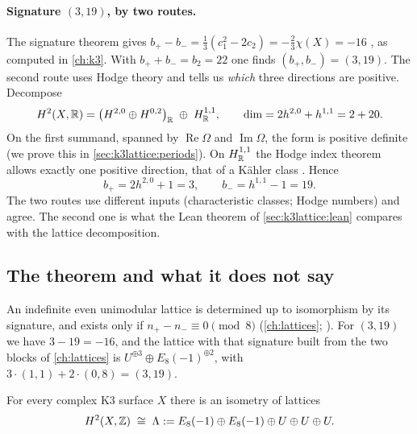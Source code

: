 \paragraph{Signature $(3,19)$, by two routes.}
The signature theorem gives $b_+-b_-=\tfrac13(c_1^2-2c_2)=-\tfrac23\chi(X)=-16$
, as computed in \cref{ch:k3}. With
$b_++b_-=b_2=22$ one finds $(b_+,b_-)=(3,19)$. The second route uses Hodge theory and tells
us \emph{which} three directions are positive. Decompose
\begin{equation}\label{eq:k3lattice:hodgesplit}
 H^2(X,\mathbb{R})=\bigl(H^{2,0}\oplus H^{0,2}\bigr)_{\mathbb{R}}\;\oplus\;H^{1,1}_{\mathbb{R}},\qquad
 \dim=2h^{2,0}+h^{1,1}=2+20 .
\end{equation}
On the first summand, spanned by $\operatorname{Re}\Omega$ and $\operatorname{Im}\Omega$, the
form is positive definite (we prove this in \cref{sec:k3lattice:periods}). On $H^{1,1}_{\mathbb{R}}$ the
Hodge index theorem allows exactly one positive direction, that of a Kähler class
. Hence
\begin{equation}\label{eq:k3lattice:bpm}
 b_+=2h^{2,0}+1=3,\qquad b_-=h^{1,1}-1=19 .
\end{equation}
The two routes use different inputs (characteristic classes; Hodge numbers) and agree. The
second one is what the Lean theorem  of
\cref{sec:k3lattice:lean} compares with the lattice decomposition.

\subsection{The theorem and what it does not say}
An indefinite even unimodular lattice is determined up to isomorphism by its signature, and
exists only if $n_+-n_-\equiv0\pmod8$ (\cref{ch:lattices};
). For $(3,19)$ we have $3-19=-16$, and the lattice
with that signature built from the two blocks of \cref{ch:lattices} is
$U^{\oplus3}\oplus E_8(-1)^{\oplus2}$, with $3\cdot(1,1)+2\cdot(0,8)=(3,19)$.

\begin{theorem}\label{thm:k3lattice:lattice}
For every complex K3 surface $X$ there is an isometry of lattices
\begin{equation}\label{eq:k3lattice:lattice}
 H^2(X,\mathbb{Z})\;\cong\;\Lambda:=E_8(-1)\oplus E_8(-1)\oplus U\oplus U\oplus U .
\end{equation}
\TL{} 
\end{theorem}

